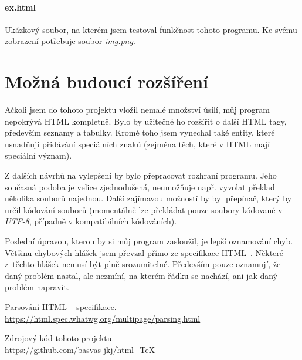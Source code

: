 \documentclass[a4paper,12pt]{article}
\begin{document}
	\paragraph{ex.html}
	Ukázkový soubor, na kterém jsem testoval funkčnost tohoto programu. Ke svému zobrazení potřebuje soubor \emph{img.png}.

	\section{Možná budoucí rozšíření}
	Ačkoli jsem do tohoto projektu vložil nemalé množství úsilí, můj program nepokrývá HTML kompletně.
	Bylo by užitečné ho rozšířit o další HTML tagy, především seznamy a tabulky. Kromě toho jsem vynechal
	také entity, které usnadňují přidávání speciálních znaků (zejména těch, které v HTML mají speciální
	význam).
	
	Z dalších návrhů na vylepšení by bylo přepracovat rozhraní programu. Jeho současná podoba je velice
	zjednodušená, neumožňuje např. vyvolat překlad několika souborů najednou. Další zajímavou možností 
	by byl přepínač, který by určil kódování souborů (momentálně lze překládat pouze soubory kódované v \textit{UTF-8}, případně v kompatibilních kódováních).
	
	Poslední úpravou, kterou by si můj program zasloužil, je lepší oznamování chyb. Většinu chybových hlášek jsem převzal přímo ze specifikace HTML~\cite{specifikace}. Některé z~těchto hlášek nemusí být plně srozumitelné. Především pouze oznamují, že daný problém nastal, ale nezmíní, na kterém řádku se nachází, ani jak daný problém napravit.
	\pagebreak
	
	\begin{thebibliography}{99}
		Parsování HTML -- specifikace. \\
		\url{https://html.spec.whatwg.org/multipage/parsing.html}
		
		Zdrojový kód tohoto projektu. \\
		\url{https://github.com/basvas-jkj/html\_TeX}
	\end{thebibliography}
\end{document}
